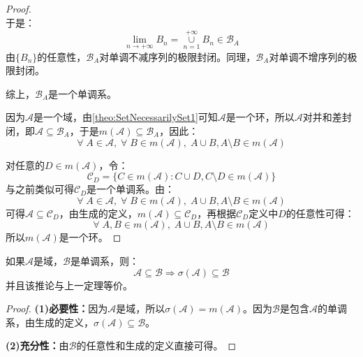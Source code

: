 \begin{proof}
\begin{equation*}
	\end{equation*}
	于是：
	\begin{equation*}
		\lim_{n\to+\infty}B_n=\underset{n=1}{\overset{+\infty}{\cup}}B_n\in\mathscr{B}_A
	\end{equation*}
	由$\{B_n\}$的任意性，$\mathscr{B}_A$对单调不减序列的极限封闭。同理，$\mathscr{B}_A$对单调不增序列的极限封闭。\par
	综上，$\mathscr{B}_A$是一个单调系。\par
	因为$\mathscr{A}$是一个域，由\cref{theo:SetNecessarilySet1}可知$\mathscr{A}$是一个环，所以$\mathscr{A}$对并和差封闭，即$\mathscr{A}\subseteq\mathscr{B}_A$，于是$m(\mathscr{A})\subseteq\mathscr{B}_A$，因此：
	\begin{equation*}
		\forall\;A\in\mathscr{A},\;\forall\;B\in m(\mathscr{A}),\; A\cup B,A\setminus B\in m(\mathscr{A})
	\end{equation*}\par
	对任意的$D\in m(\mathscr{A})$，令：
	\begin{equation*}
		\mathscr{C}_D=\{C\in m(\mathscr{A}):C\cup D,C\setminus D\in m(\mathscr{A})\}
	\end{equation*}
	与之前类似可得$\mathscr{C}_D$是一个单调系。由：
	\begin{equation*}
		\forall\;A\in\mathscr{A},\;\forall\;B\in m(\mathscr{A}),\;A\cup B,A\setminus B\in m(\mathscr{A})
	\end{equation*}
	可得$\mathscr{A}\subseteq\mathscr{C}_D$，由生成的定义，$m(\mathscr{A})\subseteq\mathscr{C}_D$，再根据$\mathscr{C}_D$定义中$D$的任意性可得：
	\begin{equation*}
		\forall\;A,B\in m(\mathscr{A}),\;A\cup B,A\setminus B\in m(\mathscr{A})
	\end{equation*}
	所以$m(\mathscr{A})$是一个环。
\end{proof}
\begin{corollary}\label{cor:SigmaField=MonotoneField}
	如果$\mathscr{A}$是域，$\mathscr{B}$是单调系，则：
	\begin{equation*}
		\mathscr{A}\subseteq\mathscr{B}\Rightarrow\sigma(\mathscr{A})\subseteq\mathscr{B}
	\end{equation*}
	并且该推论与上一定理等价。
\end{corollary}
\begin{proof}
	\textbf{(1)必要性：}因为$\mathscr{A}$是域，所以$\sigma(\mathscr{A})=m(\mathscr{A})$。因为$\mathscr{B}$是包含$\mathscr{A}$的单调系，由生成的定义，$\sigma(\mathscr{A})\subseteq\mathscr{B}$。\par
	\textbf{(2)充分性：}由$\mathscr{B}$的任意性和生成的定义直接可得。
\end{proof}
